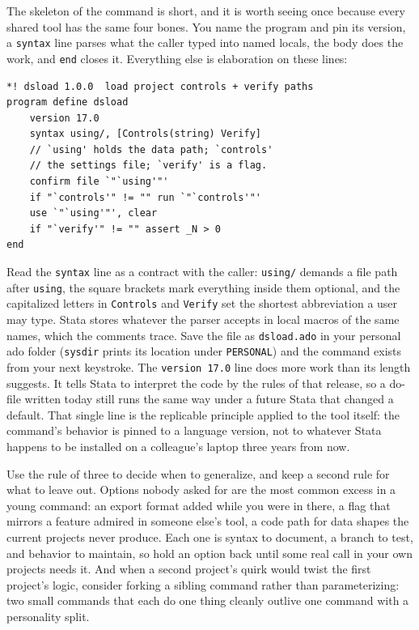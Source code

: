 The skeleton of the command is short, and it is worth seeing once because every shared tool has the same four bones. You name the program and pin its version, a \texttt{syntax} line parses what the caller typed into named locals, the body does the work, and \texttt{end} closes it. Everything else is elaboration on these lines:
\par
{\footnotesize
\begin{verbatim}
*! dsload 1.0.0  load project controls + verify paths
program define dsload
    version 17.0
    syntax using/, [Controls(string) Verify]
    // `using' holds the data path; `controls'
    // the settings file; `verify' is a flag.
    confirm file `"`using'"'
    if "`controls'" != "" run `"`controls'"'
    use `"`using'"', clear
    if "`verify'" != "" assert _N > 0
end
\end{verbatim}
}
Read the \texttt{syntax} line as a contract with the caller: \texttt{using/} demands a file path after \texttt{using}, the square brackets mark everything inside them optional, and the capitalized letters in \texttt{Controls} and \texttt{Verify} set the shortest abbreviation a user may type. Stata stores whatever the parser accepts in local macros of the same names, which the comments trace. Save the file as \texttt{dsload.ado} in your personal ado folder (\texttt{sysdir} prints its location under \texttt{PERSONAL}) and the command exists from your next keystroke.
The \texttt{version 17.0} line does more work than its length suggests. It tells Stata to interpret the code by the rules of that release, so a do-file written today still runs the same way under a future Stata that changed a default. That single line is the replicable principle applied to the tool itself: the command's behavior is pinned to a language version, not to whatever Stata happens to be installed on a colleague's laptop three years from now.

Use the rule of three to decide when to generalize, and keep a second rule for what to leave out. Options nobody asked for are the most common excess in a young command: an export format added while you were in there, a flag that mirrors a feature admired in someone else's tool, a code path for data shapes the current projects never produce. Each one is syntax to document, a branch to test, and behavior to maintain, so hold an option back until some real call in your own projects needs it. And when a second project's quirk would twist the first project's logic, consider forking a sibling command rather than parameterizing: two small commands that each do one thing cleanly outlive one command with a personality split.

